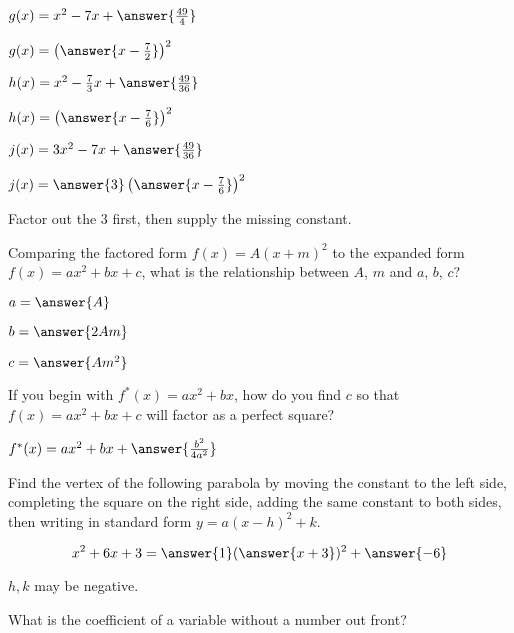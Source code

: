 \documentclass[number]{ximera}
\begin{document}
\begin{problem}
$g(x) = x^2 - 7x + \answer{\frac{49}{4}}$

$g(x) = \left(\answer{x-\frac{7}{2}}\right)^2$
\end{problem}

\begin{problem}
$h(x) = x^2 - \frac{7}{3}x +\answer{\frac{49}{36}}$

$h(x) = \left(\answer{x-\frac{7}{6}}\right)^2$
\end{problem}

\begin{problem}
$j(x) = 3x^2 - 7x + \answer{\frac{49}{36}}$ 

$j(x) = \answer{3}\left(\answer{x-\frac{7}{6}}\right)^2$

\begin{hint}Factor out the $3$ first, then supply the missing constant.
\end{hint}
\end{problem}

\begin{question}
Comparing the factored form $f(x) = A(x+m)^2$ to the expanded form $f(x) = ax^2 + bx + c$, what is the relationship between $A$, $m$ and $a$, $b$, $c$?

$a = \answer{A}$

$b = \answer{2Am}$

$c = \answer{Am^2}$
\end{question}

\begin{question}
If you begin with $f^*(x) = ax^2 + bx$, how do you find $c$ so that $f(x) = ax^2 + bx + c$ will factor as a perfect square?

$f^*(x) = ax^2 + bx + \answer{\frac{b^2}{4a^2}}$
\end{question}

\begin{question}
Find the vertex of the following parabola by moving the constant to the left side, completing the square on the right side, adding the same constant to both sides, then writing in standard form $y = a(x-h)^2 + k$.

$$x^2 + 6x + 3 = \answer{1}(\answer{x+3})^2+\answer{-6}$$

\begin{hint}
$h,k$ may be negative.
\end{hint}

\begin{hint}
What is the coefficient of a variable without a number out front?
\end{hint}


\end{question}
\end{document}
